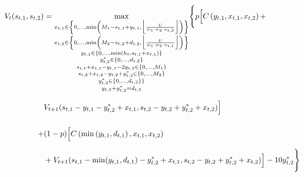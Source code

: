 \documentclass{article}
\newcommand{\bs}[1]{\boldsymbol{#1}} %
\begin{document}


\begin{align*}
    V_t(s_{t,1},s_{t,2}) &= \underset{\substack{x_{t,1} \in \left\{0,...,\min\left(M_1 - s_{t,1} + y_{t,1},\Big\lfloor \frac{U}{w_1\cdot w_2 \cdot x_{t,2}} \Big\rfloor\right)\right\} \\ x_{t,2} \in \left\{0,...,\min\left(M_2 - s_{t,2} + d_{t,2}, \Big\lfloor \frac{U}{w_1\cdot w_2\cdot x_{t,1}} \Big\rfloor\right)\right\} \\ y_{t,1} \in \left\{0,...,\min\left(h_{t}, s_{t,1} + x_{t,1}\right)\right\} \\ y_{t,2}^* \in \left\{0,...,d_{t,2}\right\} \\ s_{t,1}+x_{t,1}-y_{t,1}-2y_{t,2} \in \left\{0,...,M_1\right\} \\ s_{t,2}+x_{t,2}-y_{t,2}+y_{t,2}^* \in \left\{0,...,M_2\right\} \\ y_{t,2}^* \in \left\{0,..., d_{t,2}\}\right\} \\ y_{t,2}+y_{t,2}^* = d_{t,2}}}{\max} \Biggl\{p \Bigl[C\left(y_{t,1}, x_{t,1}, x_{t,2}\right) + \Biggr. \\ \Biggl. &V_{t+1}(s_{t,1} - y_{t,1} - y_{t,2}^* + x_{t,1}, s_{t,2} - y_{t,2}+y_{t,2}^* + x_{t,2}) \Bigr]  \\
    \Biggl.+ &(1-p)\Bigl[ C\left(\min\left(y_{t,1},d_{t,1}\right), x_{t,1}, x_{t,2}\right) \Bigr. \\  \Biggl. &+ V_{t+1}(s_{t,1} - \min(y_{t,1},d_{t,1}) - y_{t,2}^* + x_{t,1}, s_{t,2} - y_{t,2}+y_{t,2}^* + x_{t,2})  \Bigr] - 10y_{t,2}^* \Biggr\} 
\end{align*}
\end{document}
